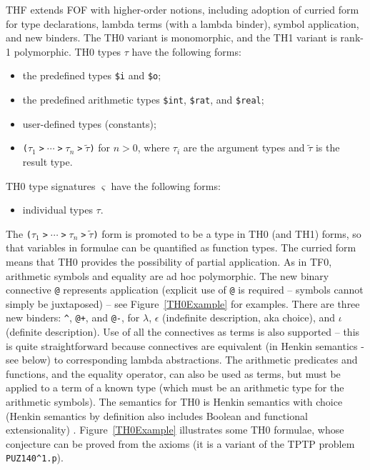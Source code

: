 \documentclass{easychair}
\begin{document}
THF extends FOF with higher-order notions, including adoption of curried 
form for type declarations, lambda terms (with a lambda binder), symbol 
application, and new binders.
The TH0 variant is monomorphic, and the TH1 variant is rank-1 polymorphic.
TH0 types $\tau$ have the following forms:
\begin{itemize}
\item the predefined types {\tt \$i} and {\tt \$o};
\item the predefined arithmetic types {\tt \$int}, {\tt \$rat}, and 
      {\tt \$real};
\item user-defined types (constants);
\item {\tt ($\tau_1\;$>$\;{\cdots}\;$>$\;\tau_n\;$>$\;\tilde \tau$)}
      for $n > 0$, where $\tau_i$ are the argument types and $\tilde \tau$
      is the result type.
\end{itemize}
TH0 type signatures $\varsigma$ have the following forms:
\begin{itemize}
\item individual types $\tau$.
\end{itemize}
The {\tt ($\tau_1\;$>$\;{\cdots}\;$>$\;\tau_n\;$>$\;\tilde \tau$)}
form is promoted to be a type in TH0 (and TH1) forms, so that variables in
formulae can be quantified as function types.
The curried form means that TH0 provides the possibility of partial
application.
As in TF0, arithmetic symbols and equality are ad hoc polymorphic.
The new binary connective {\tt @} represents application (explicit use of
{\tt @} is required -- symbols cannot simply be juxtaposed) -- see
Figure~\ref{TH0Example} for examples.
There are three new binders: {\tt \verb|^|}, {\tt @+}, and {\tt @-}, for
$\lambda$, $\epsilon$ (indefinite description, aka choice), and $\iota$
(definite description).
Use of all the connectives as terms is also supported -- this is quite
straightforward because connectives are equivalent (in Henkin semantics -
see below) to corresponding lambda abstractions.
The arithmetic predicates and functions, and the equality operator, can also
be used as terms, but must be applied to a term of a known type (which must
be an arithmetic type for the arithmetic symbols).
The semantics for TH0 is Henkin semantics with choice (Henkin semantics
by definition also includes Boolean and functional extensionality)
\cite{BBK04,Hen50}.
Figure~\ref{TH0Example} illustrates some TH0 formulae, whose conjecture can
be proved from the axioms (it is a variant of the TPTP problem
{\tt PUZ140\verb|^|1.p}).
\end{document}
